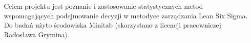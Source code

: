 Celem projektu jest poznanie i zastosowanie statystycznych metod
wspomagających podejmowanie decyzji w metodyce zarządzania Lean Six Sigma.
Do badań użyto środowiska Minitab (skorzystano z licencji pracowniczej 
Radosława Grymina).